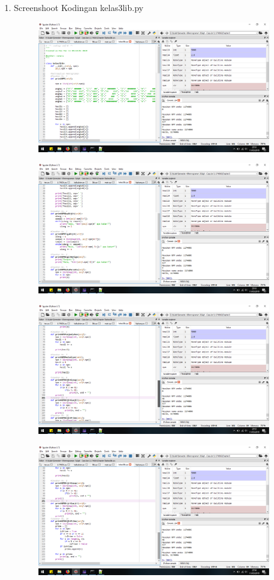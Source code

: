 \begin{enumerate}
\item Screenshoot Kodingan kelas3lib.py
\begin{figure}[H]
	\includegraphics[width=10cm]{figures/diva/Chapter3/kelas3lib_1.png}
	\centering
\end{figure}
\begin{figure}[H]
	\includegraphics[width=10cm]{figures/diva/Chapter3/kelas3lib_2.png}
	\centering
\end{figure}
\begin{figure}[H]
	\includegraphics[width=10cm]{figures/diva/Chapter3/kelas3lib_3.png}
	\centering
\end{figure}
\begin{figure}[H]
	\includegraphics[width=10cm]{figures/diva/Chapter3/kelas3lib_4.png}
	\centering
\end{figure}


\end{enumerate}
